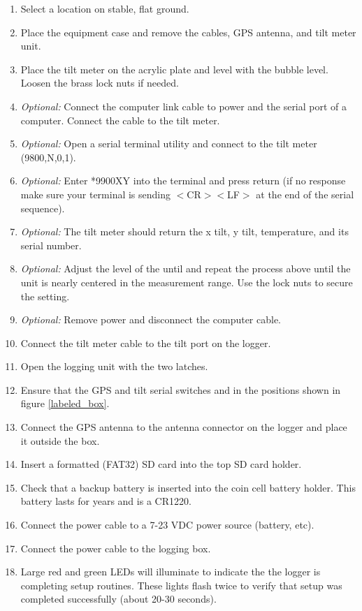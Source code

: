 \documentclass[11pt]{article} %
\begin{document}
\begin{enumerate}
\item Select a location on stable, flat ground.
\item Place the equipment case and remove the cables, GPS antenna, and tilt meter unit.
\item Place the tilt meter on the acrylic plate and level with the bubble level. Loosen the brass lock nuts if needed.
\item \emph{Optional:} Connect the computer link cable to power and the serial port of a computer. Connect the cable to the tilt meter.
\item \emph{Optional:} Open a serial terminal utility and connect to the tilt meter (9800,N,0,1).
\item \emph{Optional:} Enter *9900XY into the terminal and press return (if no response make sure your terminal is sending $<$CR$><$LF$>$ at the end of the serial sequence).
\item \emph{Optional:} The tilt meter should return the x tilt, y tilt, temperature, and its serial number.
\item \emph{Optional:} Adjust the level of the until and repeat the process above until the unit is nearly centered in the measurement range. Use the lock nuts to secure the setting.
\item \emph{Optional:} Remove power and disconnect the computer cable. 
\item Connect the tilt meter cable to the tilt port on the logger.
\item Open the logging unit with the two latches.
\item Ensure that the GPS and tilt serial switches and in the positions shown in figure \ref{labeled_box}.
\item Connect the GPS antenna to the antenna connector on the logger and place it outside the box.
\item Insert a formatted (FAT32) SD card into the top SD card holder.
\item Check that a backup battery is inserted into the coin cell battery holder. This battery lasts for years and is a CR1220. 
\item Connect the power cable to a 7-23 VDC power source (battery, etc).
\item Connect the power cable to the logging box. 
\item Large red and green LEDs will illuminate to indicate the the logger is completing setup routines. These lights flash twice to verify that setup was completed successfully (about 20-30 seconds).

\end{enumerate}
\end{document}
